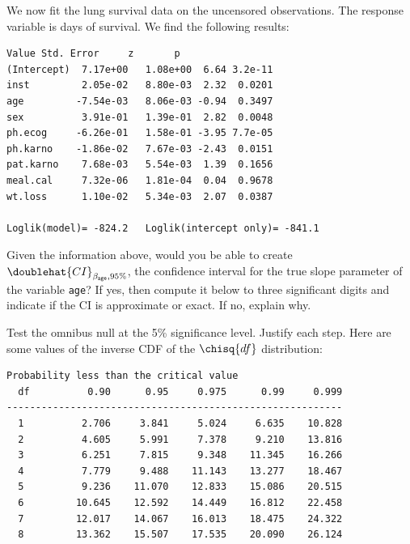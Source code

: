 \documentclass[12pt]{article}
\begin{document}
\begin{enumerate}[(a)]
\pagebreak

We now fit the lung survival data on the uncensored observations. The response variable is days of survival. We find the following results:

\begin{center}
\begin{minipage}{13cm}
\begin{Verbatim}[frame=single]
                Value Std. Error     z       p
(Intercept)  7.17e+00   1.08e+00  6.64 3.2e-11
inst         2.05e-02   8.80e-03  2.32  0.0201
age         -7.54e-03   8.06e-03 -0.94  0.3497
sex          3.91e-01   1.39e-01  2.82  0.0048
ph.ecog     -6.26e-01   1.58e-01 -3.95 7.7e-05
ph.karno    -1.86e-02   7.67e-03 -2.43  0.0151
pat.karno    7.68e-03   5.54e-03  1.39  0.1656
meal.cal     7.32e-06   1.81e-04  0.04  0.9678
wt.loss      1.10e-02   5.34e-03  2.07  0.0387

Loglik(model)= -824.2   Loglik(intercept only)= -841.1
\end{Verbatim}
\end{minipage}
\end{center}

 Given the information above, would you be able to create $\doublehat{CI}_{\beta_{\texttt{age}}, 95\%}$, the confidence interval for the true slope parameter of the variable \texttt{age}? If yes, then compute it below to three significant digits and indicate if the CI is approximate or exact. If no, explain why.

\iftoggle{solutions}{\inred{
\beqn
\doublehat{CI}_{\beta_{\texttt{age}}, 95\%} \approx \bracks{b_{\texttt{age}} \pm z_{97.5\%} s_{b_{\texttt{age}}}} = \bracks{-0.00754 \pm 1.96 \cdot 0.00806} = \bracks{-0.0233, 0.00826}
\eeqn
}}{~\spc{10}}
\pagebreak

 Test the omnibus null at the 5\% significance level. Justify each step. Here are some values of the inverse CDF of the $\chisq{df}$ distribution:

\begin{center}
\begin{minipage}{13cm}
\begin{Verbatim}[frame=single,fontsize=\small]
                Probability less than the critical value
  df          0.90      0.95     0.975      0.99     0.999
----------------------------------------------------------
  1          2.706     3.841     5.024     6.635    10.828
  2          4.605     5.991     7.378     9.210    13.816
  3          6.251     7.815     9.348    11.345    16.266
  4          7.779     9.488    11.143    13.277    18.467
  5          9.236    11.070    12.833    15.086    20.515
  6         10.645    12.592    14.449    16.812    22.458
  7         12.017    14.067    16.013    18.475    24.322
  8         13.362    15.507    17.535    20.090    26.124
\end{Verbatim}
\end{minipage}
\end{center}


\end{enumerate}
\end{document}
